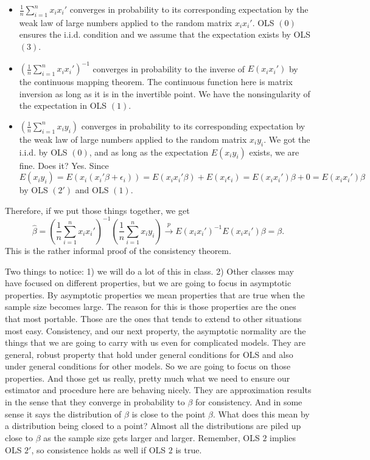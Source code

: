 \documentclass[11pt,a4paper]{amsart}
\theoremstyle{plain}
\theoremstyle{definition}
\begin{document}
 	\begin{itemize}\label{consistency pf}
 		\item $\frac{1}{n}\sum_{i=1}^{n} x_{i}x_{i}'$ converges in probability to its corresponding expectation by the weak law of large numbers applied to the random matrix $x_{i}x_{i}'$. OLS $(0)$ ensures the i.i.d. condition and we assume that the expectation exists by OLS $(3)$.
 		\item $(\frac{1}{n}\sum_{i=1}^{n} x_{i}x_{i}')^{-1}$ converges in probability to the inverse of $E(x_{i}x_{i}')$ by the continuous mapping theorem. The continuous function here is matrix inversion as long as it is in the invertible point. We have the nonsingularity of the expectation in OLS $(1)$. 
 		\item $(\frac{1}{n}\sum_{i=1}^{n}x_{i}y_{i})$ converges in probability to its corresponding expectation by the weak law of large numbers applied to the random matrix $x_{i}y_{i}$. We got the i.i.d. by OLS $(0)$, and as long as the expectation $E(x_{i}y_{i})$ exists, we are fine. Does it? Yes. Since $E(x_{i}y_{i}) = E(x_{i}(x_{i}' \beta + \epsilon_{i})) =  E(x_{i} x_{i}' \beta) + E(x_{i} \epsilon_{i}) = E(x_{i} x_{i}')\beta + 0 = E(x_{i} x_{i}')\beta$ by OLS $(2')$ and OLS $(1)$.
 	\end{itemize}
 	Therefore, if we put those things together, we get
 		\[	\hat{\beta} =  (\frac{1}{n}\sum_{i=1}^{n} x_{i}x_{i}')^{-1}(\frac{1}{n}\sum_{i=1}^{n}x_{i}y_{i}) \stackrel{p}{\longrightarrow} E(x_{i}x_{i}')^{-1}E(x_{i}x_{i}') \beta = \beta.	\]
 	This is the rather informal proof of the consistency theorem.\par 
 	Two things to notice: 1) we will do a lot of this in class. 2) Other classes may have focused on different properties, but we are going to focus in asymptotic properties.  By asymptotic properties we mean properties that are true when the sample size becomes large. The reason for this is those properties are the ones that most portable. Those are the ones that tends to extend to other situations most easy. Consistency, and our next property, the asymptotic normality are the things that we are going to carry with us even for complicated models. They are general, robust property that hold under general conditions for OLS and also under general conditions for other models. So we are going to focus on those properties. And those get us really, pretty much what we need to ensure our estimator and procedure here are behaving nicely. They are approximation results in the sense that they converge in probability to $\beta$ for consistency. And in some sense it says the distribution of $\hat{\beta}$ is close to the point $\beta$. What does this mean by a distribution being closed to a point? Almost all the distributions are piled up close to $\beta$ as the sample size gets larger and larger. Remember, OLS $2$ implies OLS $2'$, so consistence holds as well if OLS $2$ is true.\par 
\end{document}
